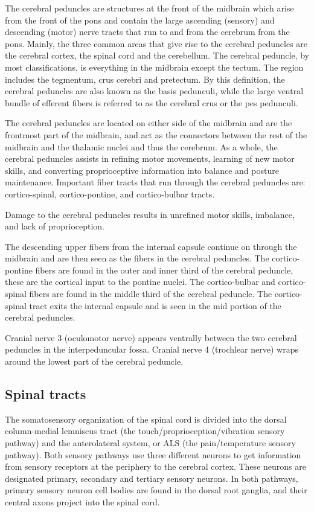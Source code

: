 The cerebral peduncles are structures at the front of the midbrain which arise from the front of the pons and contain the large ascending (sensory) and descending (motor) nerve tracts that run to and from the cerebrum from the pons. Mainly, the three common areas that give rise to the cerebral peduncles are the cerebral cortex, the spinal cord and the cerebellum. The cerebral peduncle, by most classifications, is everything in the midbrain except the tectum. The region includes the tegmentum, crus cerebri and pretectum. By this definition, the cerebral peduncles are also known as the basis pedunculi, while the large ventral bundle of efferent fibers is referred to as the cerebral crus or the pes pedunculi.

The cerebral peduncles are located on either side of the midbrain and are the frontmost part of the midbrain, and act as the connectors between the rest of the midbrain and the thalamic nuclei and thus the cerebrum. As a whole, the cerebral peduncles assists in refining motor movements, learning of new motor skills, and converting proprioceptive information into balance and posture maintenance. Important fiber tracts that run through the cerebral peduncles are: cortico-spinal, cortico-pontine, and cortico-bulbar tracts.

Damage to the cerebral peduncles results in unrefined motor skills, imbalance, and lack of proprioception.

The descending upper fibers from the internal capsule continue on through the midbrain and are then seen as the fibers in the cerebral peduncles. The cortico-pontine fibers are found in the outer and inner third of the cerebral peduncle, these are the cortical input to the pontine nuclei. The cortico-bulbar and cortico-spinal fibers are found in the middle third of the cerebral peduncle. The cortico-spinal tract exits the internal capsule and is seen in the mid portion of the cerebral peduncles.

Cranial nerve 3 (oculomotor nerve) appears ventrally between the two cerebral peduncles in the interpeduncular fossa. Cranial nerve 4 (trochlear nerve) wraps around the lowest part of the cerebral peduncle.

\hypertarget{spinal-tracts}{%
\subsection{Spinal tracts}\label{spinal-tracts}}

The somatosensory organization of the spinal cord is divided into the dorsal column-medial lemniscus tract (the touch/proprioception/vibration sensory pathway) and the anterolateral system, or ALS (the pain/temperature sensory pathway). Both sensory pathways use three different neurons to get information from sensory receptors at the periphery to the cerebral cortex. These neurons are designated primary, secondary and tertiary sensory neurons. In both pathways, primary sensory neuron cell bodies are found in the dorsal root ganglia, and their central axons project into the spinal cord.

